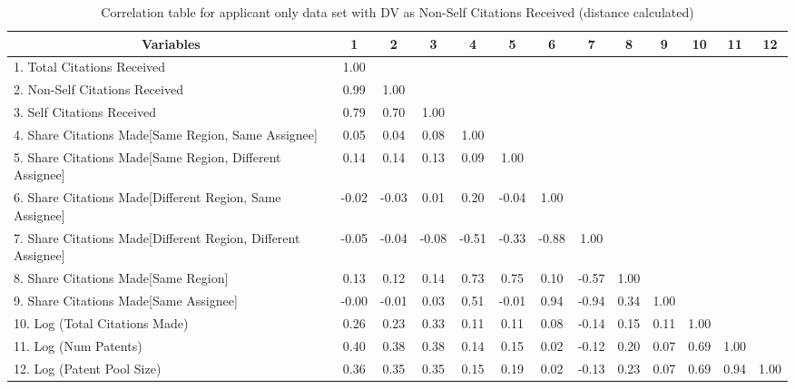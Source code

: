 \begin{table}[htbp]\centering \caption{Correlation table for applicant only data set with DV as Non-Self Citations Received (distance calculated)\label{a.ncorrelation}}
\scriptsize
\singlespacing
\begin{adjustbox}{angle=90}
\begin{tabular}{l  c  c  c  c  c  c  c  c  c  c  c  c }\hline\hline
\multicolumn{1}{c}{Variables} &1&2&3&4&5&6&7&8&9&10&11&12\\ \hline
1. Total Citations Received&1.00\\
2. Non-Self Citations Received&0.99&1.00\\
3. Self Citations Received&0.79&0.70&1.00\\
4. Share Citations Made[Same Region, Same Assignee]&0.05&0.04&0.08&1.00\\
5. Share Citations Made[Same Region, Different Assignee]&0.14&0.14&0.13&0.09&1.00\\
6. Share Citations Made[Different Region, Same Assignee]&-0.02&-0.03&0.01&0.20&-0.04&1.00\\
7. Share Citations Made[Different Region, Different Assignee]&-0.05&-0.04&-0.08&-0.51&-0.33&-0.88&1.00\\
8. Share Citations Made[Same Region]&0.13&0.12&0.14&0.73&0.75&0.10&-0.57&1.00\\
9. Share Citations Made[Same Assignee]&-0.00&-0.01&0.03&0.51&-0.01&0.94&-0.94&0.34&1.00\\
10. Log (Total Citations Made)&0.26&0.23&0.33&0.11&0.11&0.08&-0.14&0.15&0.11&1.00\\
11. Log (Num Patents)&0.40&0.38&0.38&0.14&0.15&0.02&-0.12&0.20&0.07&0.69&1.00\\
12. Log (Patent Pool Size)&0.36&0.35&0.35&0.15&0.19&0.02&-0.13&0.23&0.07&0.69&0.94&1.00\\
\hline \hline 
 \end{tabular}
 \end{adjustbox}
\end{table}
